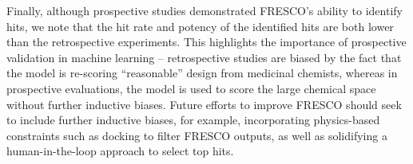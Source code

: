 Finally, although prospective studies demonstrated FRESCO's ability to identify hits, we note that the hit rate and potency of the identified hits are both lower than the retrospective experiments. This highlights the importance of prospective validation in machine learning -- retrospective studies are biased by the fact that the model is re-scoring ``reasonable'' design from medicinal chemists, whereas in prospective evaluations, the model is used to score the large chemical space without further inductive biases. Future efforts to improve FRESCO should seek to include further inductive biases, for example, incorporating physics-based constraints such as docking to filter FRESCO outputs, as well as solidifying a human-in-the-loop approach to select top hits. 